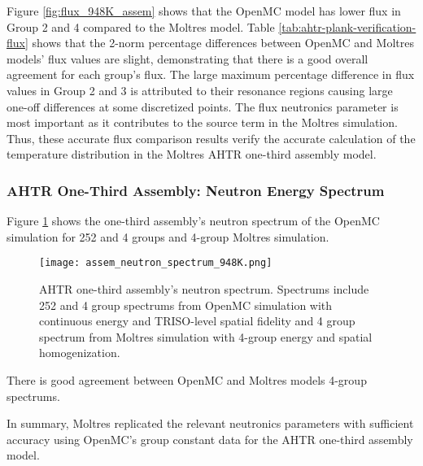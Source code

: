 Figure \ref{fig:flux_948K_assem} shows that the OpenMC model has 
lower flux in Group 2 and 4 compared to the Moltres model. 
Table \ref{tab:ahtr-plank-verification-flux} shows that the 2-norm percentage differences 
between OpenMC and Moltres models' flux values are slight, demonstrating that there is a 
good overall agreement for each group's flux.
The large maximum percentage difference in flux values in Group 2 and 3 is attributed to 
their resonance regions causing large one-off differences at some discretized points.
The flux neutronics parameter is most important as it contributes to the source term in the 
Moltres simulation. Thus, these accurate flux comparison results verify the accurate calculation 
of the temperature distribution in the Moltres \gls{AHTR} one-third assembly model. 

\subsubsection{AHTR One-Third Assembly: Neutron Energy Spectrum}
Figure \ref{fig:assem_neutron_spectrum_948K} shows the one-third assembly's neutron 
spectrum of the OpenMC simulation for 252 and 4 groups and 4-group Moltres 
simulation. 
 \begin{figure}[htbp]
    \centering
    \texttt{[image: assem\_neutron\_spectrum\_948K.png]}
    \caption{\acrfull{AHTR} one-third assembly's neutron spectrum.
    Spectrums include 252 and 4 group spectrums from OpenMC simulation with continuous 
    energy and TRISO-level spatial fidelity and 4 group spectrum from Moltres 
    simulation with 4-group energy and spatial homogenization.}  
    \label{fig:assem_neutron_spectrum_948K}
\end{figure}
There is good agreement between OpenMC and Moltres models 4-group spectrums. 

In summary, Moltres replicated the relevant neutronics parameters with sufficient 
accuracy using OpenMC's group constant data for the \gls{AHTR} one-third assembly 
model. 

